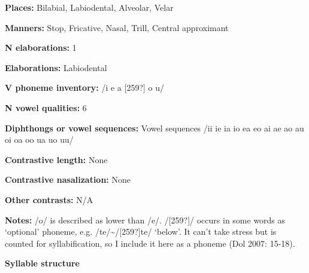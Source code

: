 \begin{styleBody}
\textbf{Places:} Bilabial, Labiodental, Alveolar, Velar
\end{styleBody}

\begin{styleBody}
\textbf{Manners:} Stop, Fricative, Nasal, Trill, Central approximant
\end{styleBody}

\begin{styleBody}
\textbf{N elaborations:} 1
\end{styleBody}

\begin{styleBody}
\textbf{Elaborations:} Labiodental
\end{styleBody}

\begin{styleBody}
\textbf{V phoneme inventory:} /i e a [259?] o u/
\end{styleBody}

\begin{styleBody}
\textbf{N vowel qualities:} 6
\end{styleBody}

\begin{styleBody}
\textbf{Diphthongs or vowel sequences:} Vowel sequences /ii ie ia io ea eo ai ae ao au oi oa oo ua uo uu/
\end{styleBody}

\begin{styleBody}
\textbf{Contrastive length:} None
\end{styleBody}

\begin{styleBody}
\textbf{Contrastive nasalization:} None
\end{styleBody}

\begin{styleBody}
\textbf{Other contrasts:} N/A
\end{styleBody}

\begin{styleBody}
\textbf{Notes:} /o/ is described as lower than /e/. /[259?]/ occurs in some words as ‘optional’ phoneme, e.g. /te/\~{}/[259?]te/ ‘below’. It can’t take stress but is counted for syllabification, so I include it here as a phoneme (Dol 2007: 15-18).
\end{styleBody}

\begin{styleBody}
\textbf{Syllable structure}
\end{styleBody}

